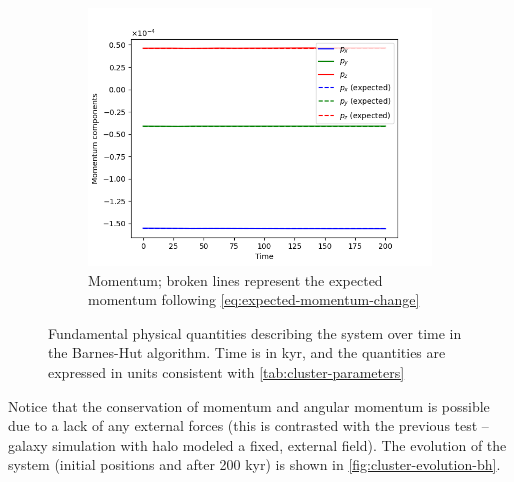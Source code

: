 \begin{figure}[htp]
    \vspace{0.5cm}

    \begin{subfigure}[b]{0.45\textwidth}
        \centering
        \includegraphics[width=\textwidth]{chapters/results/img/bh-cluster/momentum.png}
        \caption{Momentum; broken lines represent the expected momentum following \autoref{eq:expected-momentum-change}}
        \label{fig:physical-quantities-bh-cluster-sub3}
    \end{subfigure}

    \caption{Fundamental physical quantities describing the system over time in the Barnes-Hut algorithm.
        Time is in kyr, and the quantities are expressed in units consistent with \autoref{tab:cluster-parameters}}
    \label{fig:physical-quantities-bh-cluster}
\end{figure}
Notice that the conservation of momentum and angular momentum is possible due to a lack of any external forces (this is contrasted with the previous test -- galaxy simulation with halo modeled a fixed, external field).
The evolution of the system (initial positions and after 200 kyr) is shown in \autoref{fig:cluster-evolution-bh}.
